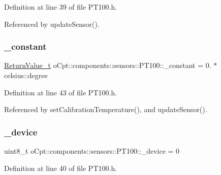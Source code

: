 Definition at line 39 of file P\+T100.\+h.



Referenced by update\+Sensor().

\hypertarget{classo_cpt_1_1components_1_1sensors_1_1_p_t100_ab4c73209cb0b9daf21a8f8af2db17165}{}\label{classo_cpt_1_1components_1_1sensors_1_1_p_t100_ab4c73209cb0b9daf21a8f8af2db17165} 
\subsubsection{\texorpdfstring{\+\_\+constant}{\_constant}}
{\footnotesize\ttfamily \hyperlink{classo_cpt_1_1components_1_1sensors_1_1_p_t100_a46c281d97bd4bd34e16f486a6aeda82e}{Return\+Value\+\_\+t} o\+Cpt\+::components\+::sensors\+::\+P\+T100\+::\+\_\+constant = 0. $\ast$ celsius\+::degree\hspace{0.3cm}{\ttfamily [private]}}



Definition at line 43 of file P\+T100.\+h.



Referenced by set\+Calibration\+Temperature(), and update\+Sensor().

\hypertarget{classo_cpt_1_1components_1_1sensors_1_1_p_t100_af67b953bcfc2a50b211a36a6df5f311c}{}\label{classo_cpt_1_1components_1_1sensors_1_1_p_t100_af67b953bcfc2a50b211a36a6df5f311c} 
\subsubsection{\texorpdfstring{\+\_\+device}{\_device}}
{\footnotesize\ttfamily uint8\+\_\+t o\+Cpt\+::components\+::sensors\+::\+P\+T100\+::\+\_\+device = 0\hspace{0.3cm}{\ttfamily [private]}}



Definition at line 40 of file P\+T100.\+h.

\hypertarget{classo_cpt_1_1components_1_1sensors_1_1_p_t100_a2789fca642c8948774378dc157599335}{}\label{classo_cpt_1_1components_1_1sensors_1_1_p_t100_a2789fca642c8948774378dc157599335} 
